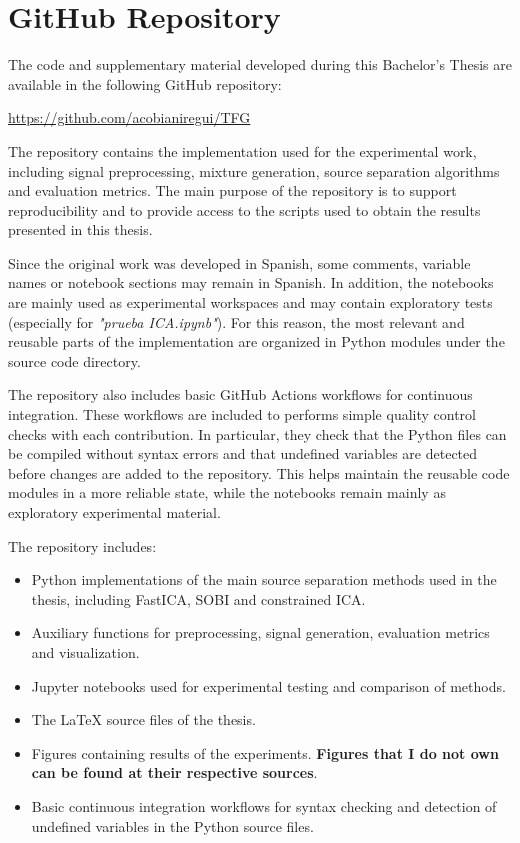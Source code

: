 \appendix
\renewcommand{\chaptername}{Appendix}
\renewcommand{\thechapter}{\Roman{chapter}}
\chapter{GitHub Repository}

The code and supplementary material developed during this Bachelor's Thesis are available in the following GitHub repository:

\begin{center}
\url{https://github.com/acobianiregui/TFG}
\end{center}

The repository contains the implementation used for the experimental work, including signal preprocessing, mixture generation, source separation algorithms and evaluation metrics. The main purpose of the repository is to support reproducibility and to provide access to the scripts used to obtain the results presented in this thesis.

Since the original work was developed in Spanish, some comments, variable names or notebook sections may remain in Spanish. In addition, the notebooks are mainly used as experimental workspaces and may contain exploratory tests (especially for \textit{"prueba ICA.ipynb"}). For this reason, the most relevant and reusable parts of the implementation are organized in Python modules under the source code directory.

The repository also includes basic GitHub Actions workflows for continuous integration. These workflows are included to performs simple quality control checks with each contribution. In particular, they check that the Python files can be compiled without syntax errors and that undefined variables are detected before changes are added to the repository. This helps maintain the reusable code modules in a more reliable state, while the notebooks remain mainly as exploratory experimental material.

The repository includes:

\begin{itemize}
    \item Python implementations of the main source separation methods used in the thesis, including FastICA, SOBI and constrained ICA.
    \item Auxiliary functions for preprocessing, signal generation, evaluation metrics and visualization.
    \item Jupyter notebooks used for experimental testing and comparison of methods.
    \item The LaTeX source files of the thesis.
    \item Figures containing results of the experiments. \textbf{Figures that I do not own can be found at their respective sources}.
    \item Basic continuous integration workflows for syntax checking and detection of undefined variables in the Python source files.
\end{itemize}

